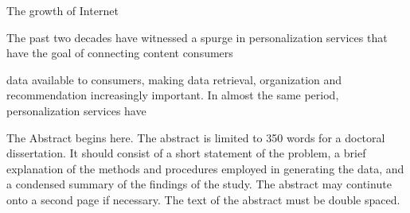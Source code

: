 \documentclass[12pt]{ucsddissertation}
\begin{document}
\begin{dissertationabstract}

The growth of Internet 

The past two decades have witnessed a spurge in personalization services that have the goal of connecting content consumers 

data available to consumers, making data retrieval, organization and recommendation increasingly important. In almost the same period, personalization services have 

The Abstract begins here. The abstract is limited to 350 words for a
doctoral dissertation. It should consist of a short statement of the
problem, a brief explanation of the methods and procedures employed in
generating the data, and a condensed summary of the findings of the
study. The abstract may continute onto a second page if necessary. The
text of the abstract must be double spaced.
\end{dissertationabstract}

\mainmatter
\end{document}
